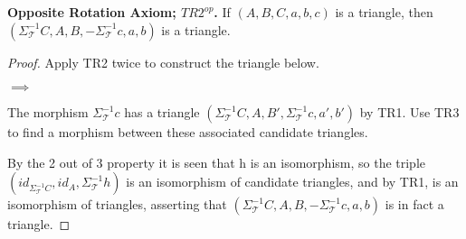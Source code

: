     \begin{lemma} \textbf{Opposite Rotation Axiom; $TR2^{op}$.}
        If $(A,B,C,a,b,c)$ is a triangle, then $(\Sigma_{\mathcal{T}}^{-1}C,A,B,-\Sigma_{\mathcal{T}}^{-1}c,a,b)$ is a triangle.
    \end{lemma}

    \begin{proof}
        Apply TR2 twice to construct the triangle below.
        \begin{center}
            $\implies$
        \end{center}
        The morphism $\Sigma_{\mathcal{T}}^{-1}c$ has a triangle $(\Sigma_{\mathcal{T}}^{-1}C,A,B',\Sigma_{\mathcal{T}}^{-1}c,a',b')$ by TR1. Use TR3 to find a morphism between these associated candidate triangles.
        \begin{center}
        \end{center}
        By the 2 out of 3 property it is seen that h is an isomorphism, so the triple $(id_{\Sigma_{\mathcal{T}}^{-1}C}, id_A, \Sigma_{\mathcal{T}}^{-1}h)$ is an isomorphism of candidate triangles, and by TR1, is an isomorphism of triangles, asserting that $(\Sigma_{\mathcal{T}}^{-1}C,A,B,-\Sigma_{\mathcal{T}}^{-1}c,a,b)$ is in fact a triangle.
    \end{proof}

